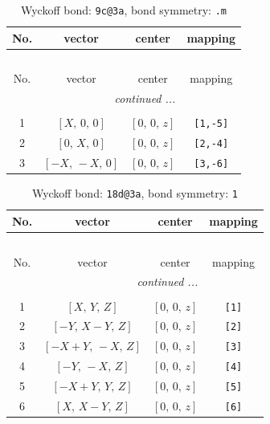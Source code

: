 \documentclass[fleqn,8pt]{jsarticle}
\begin{document}
\renewcommand{\arraystretch}{1.2}
\begin{longtable}{cccc}
\caption{Wyckoff bond: {\tt 9c@3a}, bond symmetry: {\tt .m}}
 \\
 \hline \hline
No. & vector & center & mapping \\ \hline \endfirsthead

\multicolumn{3}{l}{\tablename\ \thetable{}} \\
 \hline \hline
No. & vector & center & mapping \\ \hline \endhead

 \hline \hline
\multicolumn{3}{r}{\footnotesize\it continued ...} \\ \endfoot

 \hline \hline
\multicolumn{3}{r}{} \\ \endlastfoot

1 & $\left[ X,\, 0,\, 0 \right]$ & $\left[ 0,\, 0,\, z \right]$ & {\tt [1,-5]} \\ \hline
2 & $\left[ 0,\, X,\, 0 \right]$ & $\left[ 0,\, 0,\, z \right]$ & {\tt [2,-4]} \\ \hline
3 & $\left[ - X,\, - X,\, 0 \right]$ & $\left[ 0,\, 0,\, z \right]$ & {\tt [3,-6]} \\
\end{longtable}
\renewcommand{\arraystretch}{1.2}
\begin{longtable}{cccc}
\caption{Wyckoff bond: {\tt 18d@3a}, bond symmetry: {\tt 1}}
 \\
 \hline \hline
No. & vector & center & mapping \\ \hline \endfirsthead

\multicolumn{3}{l}{\tablename\ \thetable{}} \\
 \hline \hline
No. & vector & center & mapping \\ \hline \endhead

 \hline \hline
\multicolumn{3}{r}{\footnotesize\it continued ...} \\ \endfoot

 \hline \hline
\multicolumn{3}{r}{} \\ \endlastfoot

1 & $\left[ X,\, Y,\, Z \right]$ & $\left[ 0,\, 0,\, z \right]$ & {\tt [1]} \\ \hline
2 & $\left[ - Y,\, X - Y,\, Z \right]$ & $\left[ 0,\, 0,\, z \right]$ & {\tt [2]} \\ \hline
3 & $\left[ - X + Y,\, - X,\, Z \right]$ & $\left[ 0,\, 0,\, z \right]$ & {\tt [3]} \\ \hline
4 & $\left[ - Y,\, - X,\, Z \right]$ & $\left[ 0,\, 0,\, z \right]$ & {\tt [4]} \\ \hline
5 & $\left[ - X + Y,\, Y,\, Z \right]$ & $\left[ 0,\, 0,\, z \right]$ & {\tt [5]} \\ \hline
6 & $\left[ X,\, X - Y,\, Z \right]$ & $\left[ 0,\, 0,\, z \right]$ & {\tt [6]} \\
\end{longtable}
\end{document}
